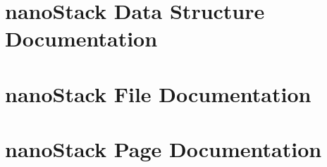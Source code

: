 \documentclass[a4paper]{book}
\begin{document}
\chapter{nano\-Stack Data Structure Documentation}










































\chapter{nano\-Stack File Documentation}



















































\chapter{nano\-Stack Page Documentation}

\printindex
\end{document}
